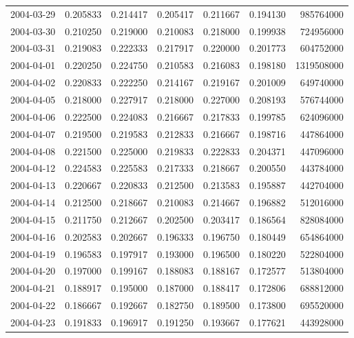 \begin{tabular}{lrrrrrr}
2004-03-29 &    0.205833 &    0.214417 &    0.205417 &    0.211667 &    0.194130 &   985764000 \\
2004-03-30 &    0.210250 &    0.219000 &    0.210083 &    0.218000 &    0.199938 &   724956000 \\
2004-03-31 &    0.219083 &    0.222333 &    0.217917 &    0.220000 &    0.201773 &   604752000 \\
2004-04-01 &    0.220250 &    0.224750 &    0.210583 &    0.216083 &    0.198180 &  1319508000 \\
2004-04-02 &    0.220833 &    0.222250 &    0.214167 &    0.219167 &    0.201009 &   649740000 \\
2004-04-05 &    0.218000 &    0.227917 &    0.218000 &    0.227000 &    0.208193 &   576744000 \\
2004-04-06 &    0.222500 &    0.224083 &    0.216667 &    0.217833 &    0.199785 &   624096000 \\
2004-04-07 &    0.219500 &    0.219583 &    0.212833 &    0.216667 &    0.198716 &   447864000 \\
2004-04-08 &    0.221500 &    0.225000 &    0.219833 &    0.222833 &    0.204371 &   447096000 \\
2004-04-12 &    0.224583 &    0.225583 &    0.217333 &    0.218667 &    0.200550 &   443784000 \\
2004-04-13 &    0.220667 &    0.220833 &    0.212500 &    0.213583 &    0.195887 &   442704000 \\
2004-04-14 &    0.212500 &    0.218667 &    0.210083 &    0.214667 &    0.196882 &   512016000 \\
2004-04-15 &    0.211750 &    0.212667 &    0.202500 &    0.203417 &    0.186564 &   828084000 \\
2004-04-16 &    0.202583 &    0.202667 &    0.196333 &    0.196750 &    0.180449 &   654864000 \\
2004-04-19 &    0.196583 &    0.197917 &    0.193000 &    0.196500 &    0.180220 &   522804000 \\
2004-04-20 &    0.197000 &    0.199167 &    0.188083 &    0.188167 &    0.172577 &   513804000 \\
2004-04-21 &    0.188917 &    0.195000 &    0.187000 &    0.188417 &    0.172806 &   688812000 \\
2004-04-22 &    0.186667 &    0.192667 &    0.182750 &    0.189500 &    0.173800 &   695520000 \\
2004-04-23 &    0.191833 &    0.196917 &    0.191250 &    0.193667 &    0.177621 &   443928000 \\

\end{tabular}
